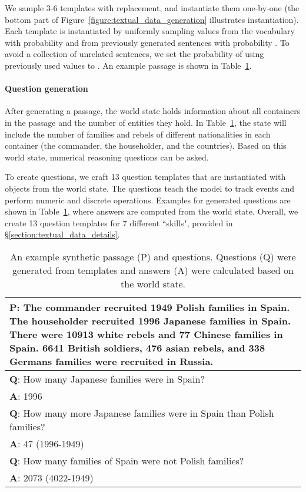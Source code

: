 \documentclass[11pt,a4paper]{article}
\begin{document}
We sample 3-6 templates with replacement, and instantiate them one-by-one (the bottom part of Figure~\ref{figure:textual_data_generation} illustrates instantiation).
Each template is instantiated by uniformly sampling values from the vocabulary with probability  and from previously generated sentences with probability . 
To avoid a collection of unrelated sentences, we set the probability of using previously used values to .
An example passage is shown in Table~\ref{table:synthetic_textual_example}. 

\paragraph{Question generation}
After generating a passage, the world state holds information about all containers in the passage and the number of entities they hold. In Table~\ref{table:synthetic_textual_example}, the state will include the number of families and rebels of different nationalities in each container (the commander, the householder, and the countries).
Based on this world state, numerical reasoning questions can be asked.

To create questions, we craft 13 question templates that are instantiated with objects from the world state. The questions teach the model to track events and perform numeric and discrete operations. Examples for generated questions are shown in Table~\ref{table:synthetic_textual_example}, where answers are computed from the world state.
Overall, we create 13 question templates for 7 different ``skills", provided in \S\ref{section:textual_data_details}.


\begin{table}[t]\setlength{\abovecaptionskip}{-2pt}\setlength{\belowcaptionskip}{-15pt}
\begin{center}
\footnotesize
\begin{tabular}{p{7.2cm}}
\toprule
\textbf{P}: The commander recruited 1949 Polish families in Spain. The householder recruited 1996 Japanese families in Spain. There were 10913 white rebels and 77 Chinese families in Spain. 6641 British soldiers, 476 asian rebels, and 338 Germans families were recruited in Russia. \\ \hline
\textbf{Q}: How many Japanese families were in Spain? \\
\textbf{A}: 1996 \\ 
\textbf{Q}: How many more Japanese families were in Spain than Polish families? \\
\textbf{A}: 47 (1996-1949) \\ 
\textbf{Q}: How many families of Spain were not Polish families? \\
\textbf{A}: 2073 (4022-1949) \\
\toprule
\end{tabular}
\end{center}
\caption{An example synthetic passage (P) and questions. Questions (Q) were generated from templates and answers (A) were calculated based on the world state.}
\label{table:synthetic_textual_example}
\end{table}
\end{document}
